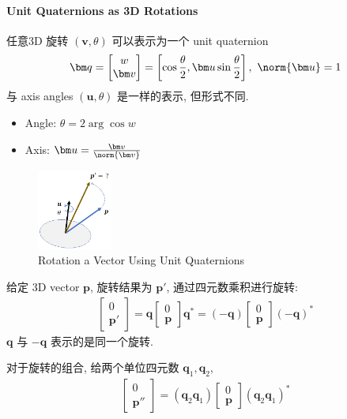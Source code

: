 \paragraph{Unit Quaternions as 3D Rotations} 任意3D 旋转 $(\bm v, \theta)$ 可以表示为一个 unit quaternion
\begin{align*}
    \bm q=\begin{bmatrix}
        w\\ \bm v
    \end{bmatrix}=\left[ \cos\frac{\theta}{2} ,  \bm u\sin\frac{\theta}{2} \right],\ \norm{\bm u}=1
\end{align*}
与 axis angles $(\bm u, \theta)$ 是一样的表示, 但形式不同.
\begin{itemize}
    \item Angle: $\theta = 2\arg \cos w$
    \item Axis: $\bm u =\frac{\bm v}{\norm{\bm v}}$
\end{itemize}

\begin{figure}[!htb]
    \centering
    \includegraphics[width=0.22\textwidth]{pic/1052/Rotation a Vector Using Unit Quaternions}
    \caption{Rotation a Vector Using Unit Quaternions}
\end{figure}

给定 3D vector $\bm p$, 旋转结果为 $\bm p'$, 通过四元数乘积进行旋转:
\begin{align*}
    \begin{bmatrix}
        0 \\ \bm p'
    \end{bmatrix}=\bm q \begin{bmatrix}
        0\\\bm p
    \end{bmatrix} \bm q^* = (-\bm q) \begin{bmatrix}
        0\\\bm p
    \end{bmatrix} (-\bm q)^* 
\end{align*}
$\bm q$ 与 $-\bm q$ 表示的是同一个旋转.

对于旋转的组合, 给两个单位四元数 $\bm q_1, \bm q_2$,
\begin{align*}
    \begin{bmatrix}
        0 \\ \bm p''
    \end{bmatrix}=(\bm q_2\bm q_1)\begin{bmatrix}
        0 \\ \bm p
    \end{bmatrix}(\bm q_2\bm q_1)^*
\end{align*}

